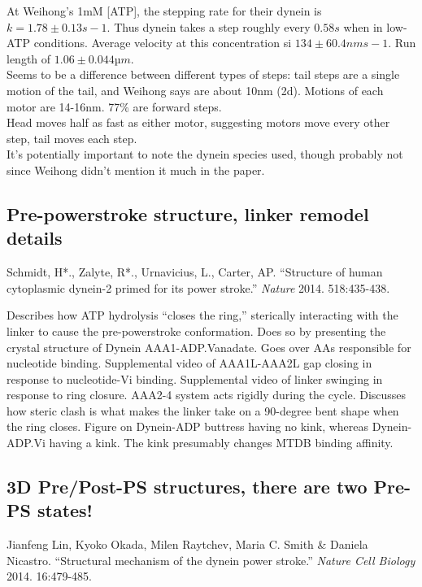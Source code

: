 \documentclass[10pt]{article} %
\begin{document}
At Weihong's 1mM [ATP], the stepping rate for their dynein is $k = 1.78 ± 0.13 s−1$. Thus dynein takes a step roughly every $0.58s$ when in low-ATP conditions. Average velocity at this concentration si $134 ± 60.4 nm s−1$. Run length of $1.06 ± 0.044 µm$.\\

Seems to be a difference between different types of steps: tail steps are a single motion of the tail, and Weihong says are about 10nm (2d). Motions of each motor are 14-16nm. 77\% are forward steps.\\

Head moves half as fast as either motor, suggesting motors move every other step, tail moves each step.\\

It's potentially important to note the dynein species used, though probably not since Weihong didn't mention it much in the paper.\\

\subsection{}

\subsection{Pre-powerstroke structure, linker remodel details}
Schmidt, H*., Zalyte, R*., Urnavicius, L., Carter, AP. ``Structure of human cytoplasmic dynein-2 primed for its power stroke.'' \textit{Nature} 2014. 518:435-438.

Describes how ATP hydrolysis ``closes the ring,'' sterically interacting with the linker to cause the pre-powerstroke conformation. Does so by presenting the crystal structure of Dynein AAA1-ADP.Vanadate. Goes over AAs responsible for nucleotide binding. Supplemental video of AAA1L-AAA2L gap closing in response to nucleotide-Vi binding. Supplemental video of linker swinging in response to ring closure. AAA2-4 system acts rigidly during the cycle. Discusses how steric clash is what makes the linker take on a 90-degree bent shape when the ring closes. Figure on Dynein-ADP buttress having no kink, whereas Dynein-ADP.Vi having a kink. The kink presumably changes MTDB binding affinity.

\subsection{3D Pre/Post-PS structures, there are two Pre-PS states!}
Jianfeng Lin, Kyoko Okada, Milen Raytchev, Maria C. Smith \& Daniela Nicastro. ``Structural mechanism of the dynein power stroke.'' \textit{Nature Cell Biology} 2014. 16:479-485.
\end{document}
